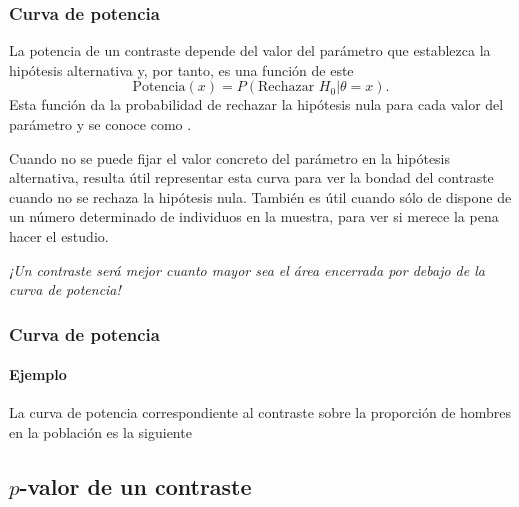 \begin{frame}
\frametitle{Curva de potencia}
La potencia de un contraste depende del valor del parámetro que establezca la hipótesis alternativa y, por tanto, es una función de este
\[
\text{Potencia}(x)= P(\text{Rechazar }H_0|\theta=x).
\]
Esta función da la probabilidad de rechazar la hipótesis nula para cada valor del parámetro y se conoce como .

Cuando no se puede fijar el valor concreto del parámetro en la hipótesis alternativa, resulta útil representar esta curva para ver la bondad del contraste cuando no se rechaza la hipótesis nula. También es útil cuando sólo de dispone de un número determinado de individuos en la muestra, para ver si merece la pena hacer el estudio.
\begin{center}
\alert{\emph{¡Un contraste será mejor cuanto mayor sea el área encerrada por debajo de la curva de potencia!}}
\end{center}
\end{frame}


\begin{frame}
\frametitle{Curva de potencia}
\framesubtitle{Ejemplo}
La curva de potencia correspondiente al contraste sobre la proporción de hombres en la población es la siguiente
\begin{center}
\scalebox{0.8}{}
\end{center}
\end{frame}


\subsection{$p$-valor de un contraste}

